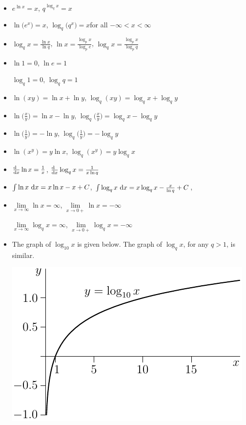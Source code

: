 \begin{itemize}
\item   
       $e^{\ln x}=x$,\quad  
       $q^{\log_q x}=x$
\item 
       $\ln \big(e^x\big)=x$,\quad
       $\log_q \big(q^x\big)=x$\quad for all $-\infty<x<\infty$ 
\item   
        $\log_q x=\frac{\ln x}{\ln q}$,\quad
        $\ln x=\frac{\log_p x}{\log_p e}$,\quad
        $\log_q x=\frac{\log_p x}{\log_p q}$
\item   
          $\ln 1=0$,\quad 
          $\ln e=1$


          $\log_q 1=0$,\quad 
          $\log_q q=1$

\item 
      $\ln(xy)=\ln x+\ln y$,\quad
      $\log_q(xy)=\log_q x+\log_q y$

\item 
     $\ln\big(\frac{x}{y}\big)=\ln x-\ln y$,\quad 
     $\log_q\big(\frac{x}{y}\big)=\log_q x-\log_q y$
 
\item 
     $\ln\big(\frac{1}{y}\big)=-\ln y$,\quad 
     $\log_q\big(\frac{1}{y}\big)=-\log_q y$

\item 
     $\ln(x^y)=y\ln x$,\quad
     $\log_q(x^y)=y\log_q x$

\item
    $\diff{\hfill}{x}\ln x = \frac{1}{x}$,\quad
    $\diff{\hfill}{x}\log_q x = \frac{1}{x\ln q}$

\item
    $\int \ln x\ \mathrm{d}x= x\ln x-x +C$,\quad
    $\int \log_q x\ \mathrm{d}x= x\log_q x-\frac{x}{\ln q} +C$,\quad

\item
    $\lim\limits_{x\rightarrow\infty}\ln x=\infty$,\quad 
           $\lim\limits_{x\rightarrow0+}\ln x=-\infty$

    $\lim\limits_{x\rightarrow\infty}\log_q x=\infty$,\quad
           $\lim\limits_{x\rightarrow0+}\log_q x=-\infty$ 

\item The graph of $\log_{10} x$ is given below. The graph of  $\log_q x$,
for any $q>1$, is similar.

\begin{center}
\includegraphics{logGraph10.pdf}
\end{center}

\end{itemize}






